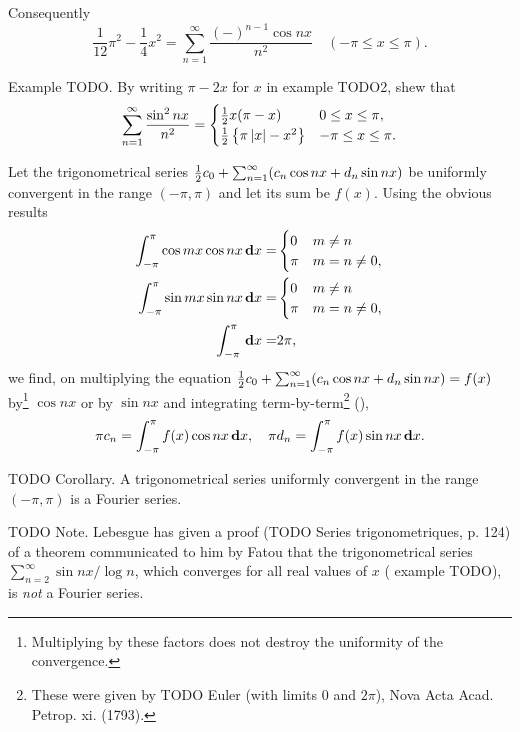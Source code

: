 Consequently
$$
\frac{1}{12} \pi^{2} - \frac{1}{4} x^{2}
=
\sum_{n=1}^{\infty}
\frac{ (-)^{n-1} \cos nx }{ n^{2} }
\quad
(-\pi \leq x \leq \pi).
$$

Example TODO.
By writing $\pi - 2x$ for $x$ in example TODO2, shew that
$$
\sum_{n=1}^{\infty} \frac{\sin^{2} nx}{n^{2}}
=
\begin{cases}
  \frac{1}{2} x (\pi - x)                         & 0 \leq x \leq \pi,   \\
  \frac{1}{2} \left\{  \pi \left| x \right| - x^{2} \right\} & -\pi \leq x \leq \pi.
\end{cases}
$$

Let the trigonometrical series
$
\frac{1}{2} c_{0}
+
\sum_{n=1}^{\infty} (c_{n} \cos nx + d_{n} \sin nx)
$
be uniformly convergent in the range $(-\pi, \pi)$ and let its sum be $f(x)$.
Using the obvious results
\begin{align*}
  \int_{-\pi}^{\pi} \cos mx \cos nx \, \mathbf{d} x
  =&
  \begin{cases}
    0 & m \neq n \\
    \pi & m = n \neq 0,
  \end{cases}
  \\
  \int_{-\pi}^{\pi} \sin mx \sin nx \, \mathbf{d} x
  =&
  \begin{cases}
    0 & m \neq n \\
    \pi & m = n \neq 0,
  \end{cases}
  \\
  \int_{-\pi}^{\pi} \, \mathbf{d} x
  =& 2\pi,
\end{align*}
we find, on multiplying the equation
$
\frac{1}{2} c_{0}
+
\sum_{n=1}^{\infty}
(c_{n} \cos nx + d_{n} \sin nx)
= f(x)
$
by\footnote{Multiplying by these factors does not destroy the uniformity of the
  convergence.}
$\cos nx$ or by $\sin nx$ and integrating
term-by-term\footnote{These were given by TODO Euler (with limits $0$ and $2\pi$),
  Nova Acta Acad. Petrop. xi. (1793).}
(),
$$
\pi c_{n} = \int_{-\pi}^{\pi} f(x) \cos nx \, \mathbf{d} x,
\quad
\pi d_{n} = \int_{-\pi}^{\pi} f(x) \sin nx \, \mathbf{d} x.
$$

TODO Corollary. A trigonometrical series uniformly convergent in the range
$(-\pi, \pi)$ is a Fourier series.

TODO Note. Lebesgue has given a proof (TODO Series trigonometriques, p. 124) of a
theorem communicated to him by Fatou that the trigonometrical series
$\sum_{n=2}^{\infty} \sin nx / \log n$, which converges for all real values of $x$
( example TODO), is \emph{not} a Fourier series.

